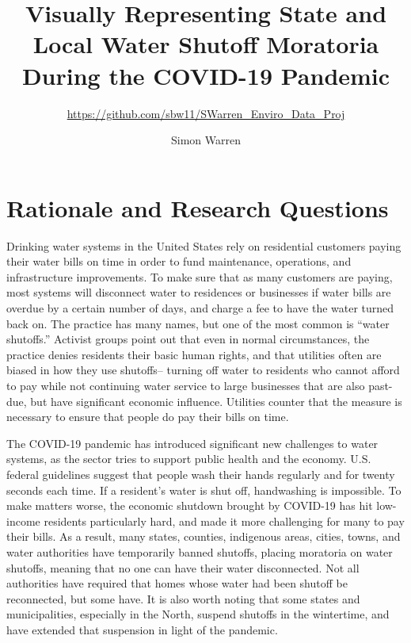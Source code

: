 \documentclass[
  12pt,
]{article}
\title{Visually Representing State and Local Water Shutoff Moratoria During the
COVID-19 Pandemic}
\subtitle{\url{https://github.com/sbw11/SWarren_Enviro_Data_Proj}}
\author{Simon Warren}
\date{}
\begin{document}
\maketitle

\newpage
\tableofcontents 
\newpage
\listoffigures
\newpage

\hypertarget{rationale-and-research-questions}{%
\section{Rationale and Research
Questions}\label{rationale-and-research-questions}}

Drinking water systems in the United States rely on residential
customers paying their water bills on time in order to fund maintenance,
operations, and infrastructure improvements. To make sure that as many
customers are paying, most systems will disconnect water to residences
or businesses if water bills are overdue by a certain number of days,
and charge a fee to have the water turned back on. The practice has many
names, but one of the most common is ``water shutoffs.'' Activist groups
point out that even in normal circumstances, the practice denies
residents their basic human rights, and that utilities often are biased
in how they use shutoffs-- turning off water to residents who cannot
afford to pay while not continuing water service to large businesses
that are also past-due, but have significant economic influence.
Utilities counter that the measure is necessary to ensure that people do
pay their bills on time.

The COVID-19 pandemic has introduced significant new challenges to water
systems, as the sector tries to support public health and the economy.
U.S. federal guidelines suggest that people wash their hands regularly
and for twenty seconds each time. If a resident's water is shut off,
handwashing is impossible. To make matters worse, the economic shutdown
brought by COVID-19 has hit low-income residents particularly hard, and
made it more challenging for many to pay their bills. As a result, many
states, counties, indigenous areas, cities, towns, and water authorities
have temporarily banned shutoffs, placing moratoria on water shutoffs,
meaning that no one can have their water disconnected. Not all
authorities have required that homes whose water had been shutoff be
reconnected, but some have. It is also worth noting that some states and
municipalities, especially in the North, suspend shutoffs in the
wintertime, and have extended that suspension in light of the pandemic.
\end{document}
